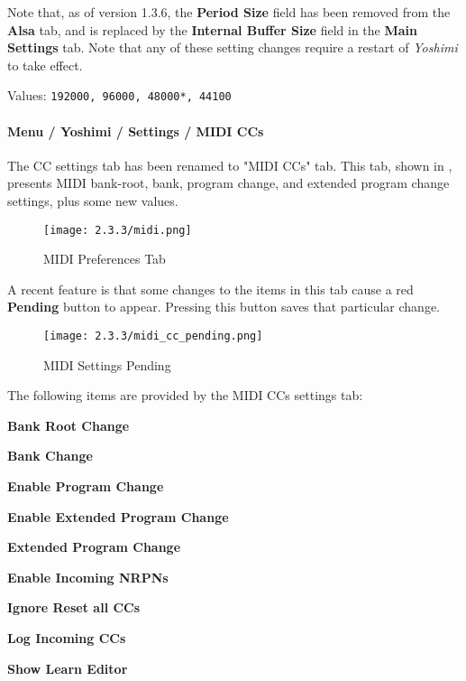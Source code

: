    Note that, as of version 1.3.6, the \textbf{Period Size} field has been
   removed from the \textbf{Alsa} tab, and is replaced by the
   \textbf{Internal Buffer Size} field in the \textbf{Main Settings} tab.
   Note that any of these setting changes require a restart of \textsl{Yoshimi}
   to take effect.

   Values: \texttt{192000, 96000, 48000*, 44100}

\paragraph{Menu / Yoshimi / Settings / MIDI CCs}
\label{paragraph:menu_yoshimi_settings_ccs}

   The CC settings tab has been renamed to "MIDI CCs" tab.
   This tab, shown in
   ,
   presents MIDI bank-root, bank, program change, and extended program
   change settings, plus some new values.

\begin{figure}[H]
   \centering
   \texttt{[image: 2.3.3/midi.png]}
   \caption[MIDI Preferences]{MIDI Preferences Tab}
   \label{fig:yoshimi_settings_cc}
\end{figure}

   A recent feature is that some changes to the items in this
   tab cause a red \textbf{Pending} button to appear.  Pressing this
   button saves that particular change.

\begin{figure}[H]
   \centering
   \texttt{[image: 2.3.3/midi\_cc\_pending.png]}
   \caption[MIDI Settings Pending]{MIDI Settings Pending}
   \label{fig:yoshimi_settings_pending}
\end{figure}

   The following items are provided by the MIDI CCs settings tab:

   \begin{enumber}
      \item \textbf{Bank Root Change}
      \item \textbf{Bank Change}
      \item \textbf{Enable Program Change}
      \item \textbf{Enable Extended Program Change}
      \item \textbf{Extended Program Change}
      \item \textbf{Enable Incoming NRPNs}
      \item \textbf{Ignore Reset all CCs}
      \item \textbf{Log Incoming CCs}
      \item \textbf{Show Learn Editor}
   \end{enumber}

